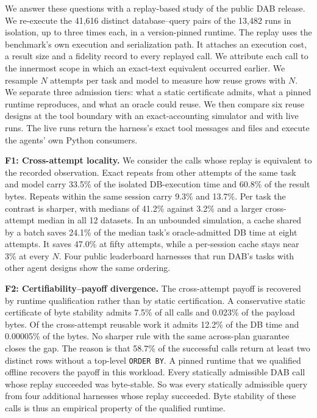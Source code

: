 We answer these questions with a replay-based study of the public DAB release. We re-execute the 41,616 distinct
database--query pairs of the 13,482 runs in isolation, up to three times each, in a version-pinned runtime. The replay
uses the benchmark's own execution and serialization path. It attaches an execution cost, a result size and a
fidelity record to every replayed call. We attribute each call to the innermost scope in which an exact-text
equivalent occurred earlier. We resample $N$ attempts per task and model to measure how reuse grows with $N$. We
separate three admission tiers: what a static certificate admits, what a pinned runtime reproduces, and what an oracle
could reuse. We then compare six reuse designs at the tool boundary with an exact-accounting simulator and with live
runs. The live runs return the harness's exact tool messages and files and execute the agents' own Python consumers.

\textbf{F1: Cross-attempt locality.} We consider the calls whose replay is equivalent to the recorded observation. Exact repeats from other attempts of the same task and model carry 33.5\% of the isolated DB-execution time and 60.8\% of the result bytes. Repeats within the same session carry 9.3\% and 13.7\%. Per task the contrast is sharper, with medians of
41.2\% against 3.2\% and a larger cross-attempt median in all 12 datasets. In an unbounded simulation, a cache shared by a batch saves 24.1\% of the median task's oracle-admitted DB time at eight attempts. It
saves 47.0\% at fifty attempts, while a per-session cache stays near 3\% at every $N$. Four public leaderboard
harnesses that run DAB's tasks with other agent designs show the same ordering.

\textbf{F2: Certifiability--payoff divergence.} The cross-attempt payoff is recovered by runtime qualification rather
than by static certification. A conservative static certificate of byte stability admits 7.5\% of all calls and
0.023\% of the payload bytes. Of the cross-attempt reusable work it admits 12.2\% of the DB time and 0.00005\% of the
bytes. No sharper rule with the same across-plan guarantee closes the gap. The reason is that 58.7\% of the successful calls return at least two distinct rows without a top-level \texttt{ORDER BY}. A pinned runtime that we qualified offline
recovers the payoff in this workload. Every statically admissible DAB call whose replay succeeded was byte-stable. So
was every statically admissible query from four additional harnesses whose replay succeeded. Byte stability of these
calls is thus an empirical property of the qualified runtime.

